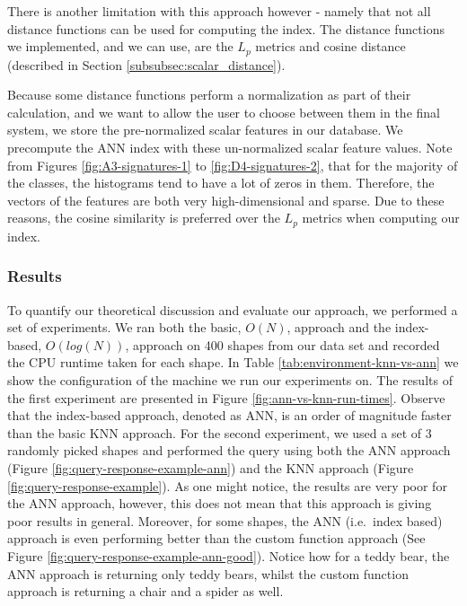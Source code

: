 There is another limitation with this approach however - namely that not all distance functions can be used for computing the index.
The distance functions we implemented, and we can use, are the $L_p$ metrics and cosine distance (described in Section \ref{subsubsec:scalar_distance}).

Because some distance functions perform a normalization as part of their calculation, and we want to allow the user to choose between them in the final system, we store the pre-normalized scalar features in our database.
We precompute the ANN index with these un-normalized scalar feature values.
Note from Figures \ref{fig:A3-signatures-1} to \ref{fig:D4-signatures-2}, that for the majority of the classes, the histograms tend to have a lot of zeros in them.
Therefore, the vectors of the features are both very high-dimensional and sparse.
Due to these reasons, the cosine similarity is preferred over the $L_p$ metrics when computing our index.

\subsubsection{Results}
To quantify our theoretical discussion and evaluate our approach, we performed a set of experiments.
We ran both the basic, $O(N)$, approach and the index-based, $O(log (N))$, approach on 400 shapes from our data set and recorded the CPU runtime taken for each shape.
In Table \ref{tab:environment-knn-vs-ann} we show the configuration of the machine we run our experiments on.
The results of the first experiment are presented in Figure \ref{fig:ann-vs-knn-run-times}.
Observe that the index-based approach, denoted as ANN, is an order of magnitude faster than the basic KNN approach.
For the second experiment, we used a set of 3 randomly picked shapes and performed the query using both the ANN approach (Figure \ref{fig:query-response-example-ann}) and the KNN approach (Figure \ref{fig:query-response-example}).
As one might notice, the results are very poor for the ANN approach, however, this does not mean that this approach is giving poor results in general.
Moreover, for some shapes, the ANN (i.e.\ index based) approach is even performing better than the custom function approach (See Figure \ref{fig:query-response-example-ann-good}).
Notice how for a teddy bear, the ANN approach is returning only teddy bears, whilst the custom function approach is returning a chair and a spider as well.

